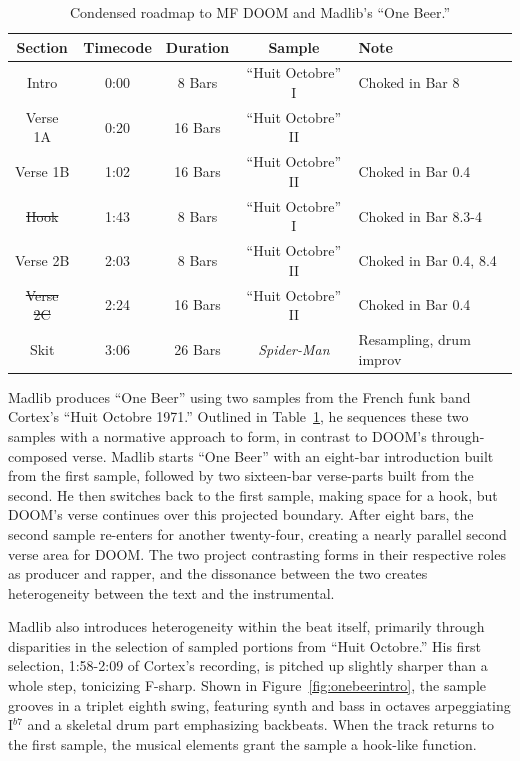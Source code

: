     \begin{table}[ht]
        \centering
            \begin{tabular}{|c|c|c|c|l|}
                 \hline
                  Section         & Timecode & Duration & Sample              & Note                    \\ \hline
                  Intro           & 0:00     & 8 Bars   & ``Huit Octobre'' I  & Choked in Bar 8         \\ \hline
                  Verse 1A        & 0:20     & 16 Bars  & ``Huit Octobre'' II &                         \\ \hline
                  Verse 1B        & 1:02     & 16 Bars  & ``Huit Octobre'' II & Choked in Bar 0.4       \\ \hline
                  \sout{Hook}     & 1:43     & 8 Bars   & ``Huit Octobre'' I  & Choked in Bar 8.3-4     \\ \hline
                  Verse 2B        & 2:03     & 8 Bars   & ``Huit Octobre'' II & Choked in Bar 0.4, 8.4  \\ \hline
                  \sout{Verse 2C} & 2:24     & 16 Bars  & ``Huit Octobre'' II & Choked in Bar 0.4       \\ \hline
                  Skit            & 3:06     & 26 Bars  & \textit{Spider-Man} & Resampling, drum improv \\ \hline
             \end{tabular}
        \caption{Condensed roadmap to MF DOOM and Madlib's ``One Beer.''}
        \label{tab:onebeer}
    \end{table}

Madlib produces ``One Beer'' using two samples from the French funk band Cortex's ``Huit Octobre
1971.'' Outlined in Table~\ref{tab:onebeer}, he sequences these two samples with a normative 
approach to form, in contrast to DOOM's through-composed verse. Madlib starts ``One Beer'' with
an eight-bar introduction built from the first sample, followed by two sixteen-bar verse-parts
built from the second. He then switches back to the first sample, making space for a hook, 
but DOOM's verse continues over this projected boundary. After eight bars, the second sample
re-enters for another twenty-four, creating a nearly parallel second verse area for DOOM. The
two project contrasting forms in their respective roles as producer and rapper, and the dissonance
between the two creates heterogeneity between the text and the instrumental.

Madlib also introduces heterogeneity within the beat itself, primarily through disparities
in the selection of sampled portions from ``Huit Octobre.'' His first selection, 1:58-2:09
of  Cortex's recording, is pitched up slightly sharper than a whole step, tonicizing F-sharp.
Shown in Figure~\ref{fig:onebeerintro}, the sample grooves in a triplet eighth swing, featuring
synth and bass  in octaves arpeggiating I$^{b7}$ and a skeletal drum part emphasizing backbeats.
When the track returns to the first sample, the musical elements grant the sample a 
hook-like function.

